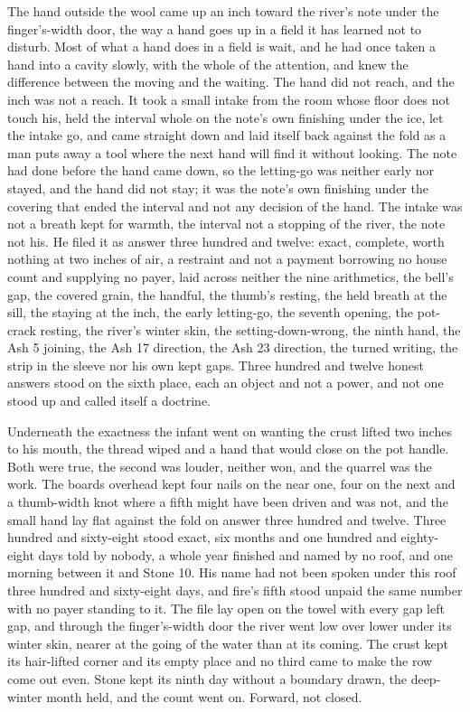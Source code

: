The hand outside the wool came up an inch toward the river's note under the finger's-width door, the way a hand goes up in a field it has learned not to disturb. Most of what a hand does in a field is wait, and he had once taken a hand into a cavity slowly, with the whole of the attention, and knew the difference between the moving and the waiting. The hand did not reach, and the inch was not a reach. It took a small intake from the room whose floor does not touch his, held the interval whole on the note's own finishing under the ice, let the intake go, and came straight down and laid itself back against the fold as a man puts away a tool where the next hand will find it without looking. The note had done before the hand came down, so the letting-go was neither early nor stayed, and the hand did not stay; it was the note's own finishing under the covering that ended the interval and not any decision of the hand. The intake was not a breath kept for warmth, the interval not a stopping of the river, the note not his. He filed it as answer three hundred and twelve: exact, complete, worth nothing at two inches of air, a restraint and not a payment borrowing no house count and supplying no payer, laid across neither the nine arithmetics, the bell's gap, the covered grain, the handful, the thumb's resting, the held breath at the sill, the staying at the inch, the early letting-go, the seventh opening, the pot-crack resting, the river's winter skin, the setting-down-wrong, the ninth hand, the Ash 5 joining, the Ash 17 direction, the Ash 23 direction, the turned writing, the strip in the sleeve nor his own kept gaps. Three hundred and twelve honest answers stood on the sixth place, each an object and not a power, and not one stood up and called itself a doctrine.

Underneath the exactness the infant went on wanting the crust lifted two inches to his mouth, the thread wiped and a hand that would close on the pot handle. Both were true, the second was louder, neither won, and the quarrel was the work. The boards overhead kept four nails on the near one, four on the next and a thumb-width knot where a fifth might have been driven and was not, and the small hand lay flat against the fold on answer three hundred and twelve. Three hundred and sixty-eight stood exact, six months and one hundred and eighty-eight days told by nobody, a whole year finished and named by no roof, and one morning between it and Stone 10. His name had not been spoken under this roof three hundred and sixty-eight days, and fire's fifth stood unpaid the same number with no payer standing to it. The file lay open on the towel with every gap left gap, and through the finger's-width door the river went low over lower under its winter skin, nearer at the going of the water than at its coming. The crust kept its hair-lifted corner and its empty place and no third came to make the row come out even. Stone kept its ninth day without a boundary drawn, the deep-winter month held, and the count went on. Forward, not closed.
